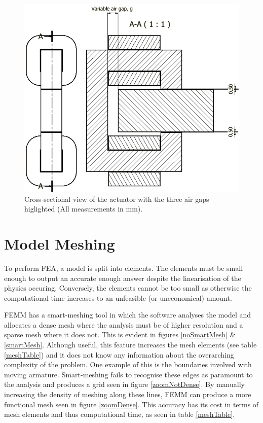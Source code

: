 \documentclass[a4paper]{IEEEtran}
\begin{document}
\begin{figure}[ht]
\includegraphics[width = \linewidth]{actuator-2.jpg}
\caption{Cross-sectional view of the actuator with the three air gaps higlighted (All measurements in mm).}
\label{xsection} 
\end{figure}

\section{Model Meshing}
To perform FEA, a model is split into elements. The elements must be small enough to output an accurate enough answer despite the linearisation of the physics occuring. Conversely, the elements cannot be too small as otherwise the computational time increases to an unfeasible (or uneconomical) amount.

FEMM has a smart-meshing tool in which the software analyses the model and allocates a dense mesh where the analysis must be of higher resolution and a sparse mesh where it does not. This is evident in figures \ref{noSmartMesh} \& \ref{smartMesh}. Although useful, this feature increases the mesh elements (see table \ref{meshTable}) and it does not know any information about the overarching complexity of the problem. One example of this is the boundaries involved with moving armature. Smart-meshing fails to recognise these edges as paramount to the analysis and produces a grid seen in figure \ref{zoomNotDense}. By manually increasing the density of meshing along these lines, FEMM can produce a more functional mesh seen in figure \ref{zoomDense}. This accuracy has its cost in terms of mesh elements and thus computational time, as seen in table \ref{meshTable}.
\end{document}

